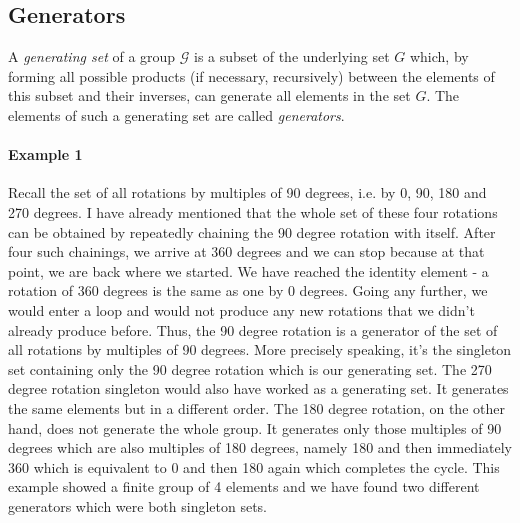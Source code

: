 \subsection{Generators}

A \emph{generating set} of a group $\mathcal{G}$ is a subset of the underlying set $G$ which, by forming all possible products (if necessary, recursively) between the elements of this subset and their inverses, can generate all elements in the set $G$. The elements of such a generating set are called \emph{generators}.

\paragraph{Example 1} Recall the set of all rotations by multiples of 90 degrees, i.e. by 0, 90, 180 and 270 degrees. I have already mentioned that the whole set of these four rotations can be obtained by repeatedly chaining the 90 degree rotation with itself. After four such chainings, we arrive at 360 degrees and we can stop because at that point, we are back where we started. We have reached the identity element - a rotation of 360 degrees is the same as one by 0 degrees. Going any further, we would enter a loop and would not produce any new rotations that we didn't already produce before. Thus, the 90 degree rotation is a generator of the set of all rotations by multiples of 90 degrees. More precisely speaking, it's the singleton set containing only the 90 degree rotation which is our generating set. The 270 degree rotation singleton would also have worked as a generating set. It generates the same elements but in a different order. The 180 degree rotation, on the other hand, does not generate the whole group. It generates only those multiples of 90 degrees which are also multiples of 180 degrees, namely 180 and then immediately 360 which is equivalent to 0 and then 180 again which completes the cycle. This example showed a finite group of 4 elements and we have found two different generators which were both singleton sets.

